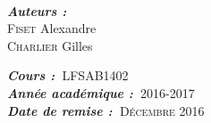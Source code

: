 \begin{titlepage}
\HRule \\[0.6cm]

 

\begin{flushleft}
\emph{\textbf{Auteurs :}}\\

\textsc{Fiset} Alexandre\\
\textsc{Charlier} Gilles \\
\end{flushleft}


\begin{flushright}
\emph{\textbf{Cours :\ }}\textsc{\large LFSAB1402}\\[0.3cm] %
\emph{\textbf{Année académique :\ }}\textsc{\large 2016-2017}\\[0.3cm] %
\emph{\textbf{Date de remise :\ }}\textsc{\large Décembre 2016 }\\
\end{flushright}
\end{titlepage}